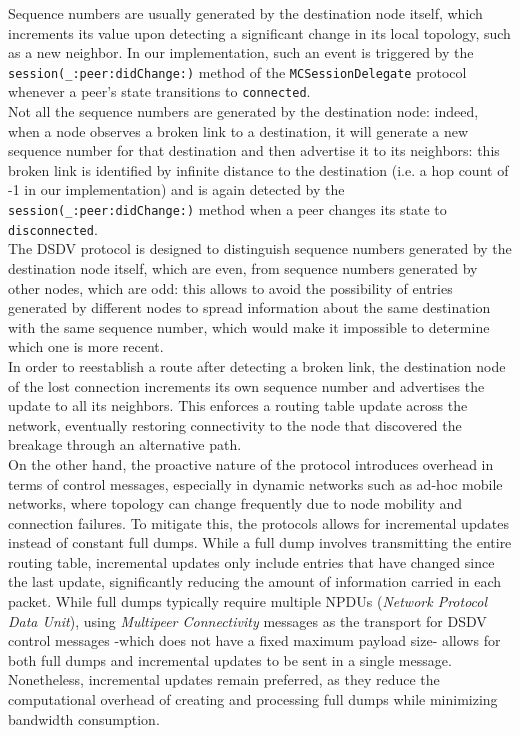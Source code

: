 \documentclass[conference]{IEEEtran}
\begin{document}
Sequence numbers are usually generated by the destination node itself, which
increments its value upon detecting a significant change in its local topology,
such as a new neighbor. In our implementation, such an event is triggered by the
\texttt{session(\_:peer:didChange:)} method of the \texttt{MCSessionDelegate}
protocol whenever a peer's state transitions to \texttt{connected}. \\
Not all the sequence numbers are generated by the destination node: indeed,
when a node observes a broken link to a destination, it will generate a new
sequence number for that destination and then advertise it 
to its neighbors: this broken link is identified by infinite distance to the
destination (i.e. a hop count of -1 in our implementation) and is again detected
by the \texttt{session(\_:peer:didChange:)} method when a peer changes its state
to \texttt{disconnected}. \\
The DSDV protocol is designed to distinguish sequence numbers generated by the
destination node itself, which are even, from sequence numbers generated by
other nodes, which are odd: this allows to avoid the possibility of entries
generated by different nodes to spread information about the same destination
with the same sequence number, which would make it impossible to determine which
one is more recent. \\ 
In order to reestablish a route after detecting a broken link, the destination
node of the lost connection increments its own sequence number and advertises
the update to all its neighbors. This enforces a routing table update across the
network, eventually restoring connectivity to the node that discovered the
breakage through an alternative path.  \\

On the other hand, the proactive nature of the protocol introduces overhead in
terms of control messages, especially in dynamic networks such as ad-hoc mobile
networks, where topology can change frequently due to node mobility and
connection failures. To mitigate this, the protocols allows for incremental
updates instead of constant full dumps. While a full dump involves transmitting
the entire routing table, incremental updates only include entries that have
changed since the last update, significantly reducing the amount of information
carried in each packet. While full dumps typically require multiple NPDUs
(\textit{Network Protocol Data Unit}), using \textit{Multipeer Connectivity}
messages as the transport for DSDV control messages -which does not have a fixed
maximum payload size- allows for both full dumps and incremental updates to be
sent in a single message. Nonetheless, incremental updates remain preferred, as
they reduce the computational overhead of creating and processing full dumps
while minimizing bandwidth consumption. \\
\end{document}
